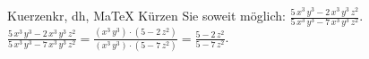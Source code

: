 \begin{MAufgabe}{Kuerzen}{kr, dh, MaTeX}
K\"urzen Sie soweit m\"oglich: $\frac{5\, x^3\, y^3 - 2\, x^3\, y^3\, z^2}{5\, x^3\, y^3 - 7\, x^3\, y^3\, z^2}$.\\ 
\ifLsg\MLoesung
\quad $\frac{5\, x^3\, y^3 - 2\, x^3\, y^3\, z^2}{5\, x^3\, y^3 - 7\, x^3\, y^3\, z^2}=\frac{(x^3\, y^3)\cdot(5 - 2\, z^2)}{(x^3\, y^3)\cdot(5 - 7\, z^2)}=\frac{5 - 2\, z^2}{5 - 7\, z^2}$.\else\relax\fi
 \end{MAufgabe}